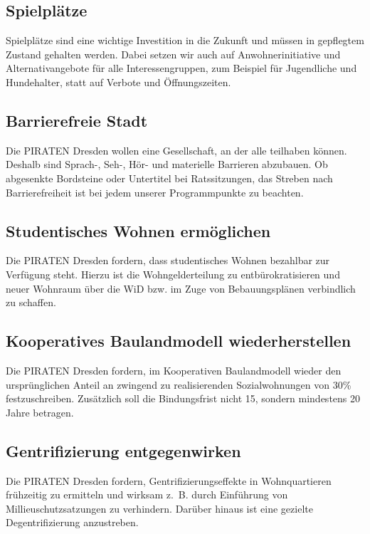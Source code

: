 \documentclass[a4paper, 11pt]{article}
\begin{document}
\subsection{Spielplätze}
Spielplätze sind eine wichtige Investition in die Zukunft und müssen in gepflegtem Zustand gehalten werden. Dabei setzen wir auch auf Anwohnerinitiative und Alternativangebote für alle Interessengruppen, zum Beispiel für Jugendliche und Hundehalter, statt auf Verbote und Öffnungszeiten.


\subsection{Barrierefreie Stadt}
Die PIRATEN Dresden wollen eine Gesellschaft, an der alle teilhaben können. Deshalb sind Sprach-, Seh-, Hör- und materielle Barrieren abzubauen. Ob abgesenkte Bordsteine oder Untertitel bei Ratssitzungen, das Streben nach Barrierefreiheit ist bei jedem unserer Programmpunkte zu beachten.


\subsection{Studentisches Wohnen ermöglichen}
Die PIRATEN Dresden fordern, dass studentisches Wohnen bezahlbar zur Verfügung steht. Hierzu ist die Wohngelderteilung zu entbürokratisieren und neuer Wohnraum über die WiD bzw. im Zuge von Bebauungsplänen verbindlich zu schaffen.


\subsection{Kooperatives Baulandmodell wiederherstellen}
Die PIRATEN Dresden fordern, im Kooperativen Baulandmodell wieder den ursprünglichen Anteil an zwingend zu realisierenden Sozialwohnungen von 30\% festzuschreiben. Zusätzlich soll die Bindungsfrist nicht 15, sondern mindestens 20 Jahre betragen.


\subsection{Gentrifizierung entgegenwirken}
Die PIRATEN Dresden fordern, Gentrifizierungseffekte in Wohnquartieren frühzeitig zu ermitteln und wirksam z. B. durch Einführung von Millieuschutzsatzungen zu verhindern. Darüber hinaus ist eine gezielte Degentrifizierung anzustreben.
\end{document}
